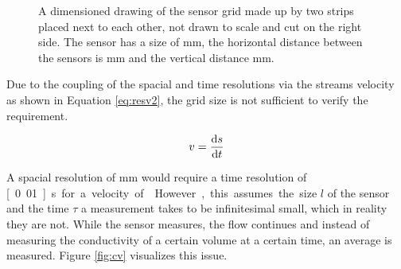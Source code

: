 \begin{figure}[H]
\begin{center}
		\caption{A dimensioned drawing of the sensor grid made up by two strips placed next to each other, not drawn to scale and cut on the right side. The sensor has a size of \unit[10x11]{mm}, the horizontal distance between the sensors is \unit[50]{mm} and the vertical distance \unit[25]{mm}.}
		\label{fig:sensarray}
	\end{center}
\end{figure}

Due to the coupling of the spacial and time resolutions via the streams velocity as shown in Equation \eqref{eq:resv2}, the grid size is not sufficient to verify the requirement. 

\begin{equation}
	v = \dfrac{\mathop{}\!\mathrm{d} s}{\mathop{}\!\mathrm{d} t}
\label{eq:resv2} 
\end{equation}

A spacial resolution of \unit[10]{mm} would require a time resolution of \unit[0.01]{s} for a velocity of . However, this assumes the size $ l $ of the sensor and the time $ \tau $ a measurement takes to be infinitesimal small, which in reality they are not. While the sensor measures, the flow continues and instead of measuring the conductivity of a certain volume at a certain time, an average is measured. Figure \ref{fig:cv} visualizes this issue.

